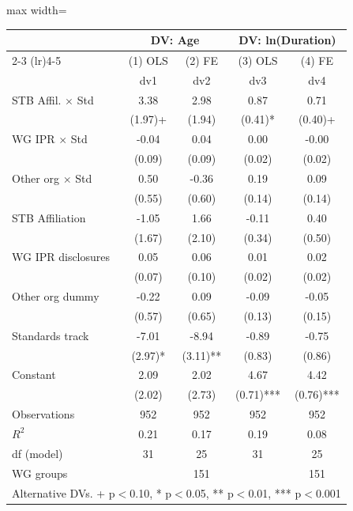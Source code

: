 \begin{adjustbox}{max width=\textwidth}
\begin{tabular}{lcccc}
\toprule
 & \multicolumn{2}{c}{DV: Age} & \multicolumn{2}{c}{DV: ln(Duration)} \\
\cmidrule(lr){2-3} \cmidrule(lr){4-5}
 & (1) OLS & (2) FE & (3) OLS & (4) FE \\
\midrule
 & dv1 & dv2 & dv3 & dv4 \\
STB Affil. $\times$ Std & 3.38 & 2.98 & 0.87 & 0.71 \\
 & (1.97)+ & (1.94) & (0.41)* & (0.40)+ \\
WG IPR $\times$ Std & -0.04 & 0.04 & 0.00 & -0.00 \\
 & (0.09) & (0.09) & (0.02) & (0.02) \\
Other org $\times$ Std & 0.50 & -0.36 & 0.19 & 0.09 \\
 & (0.55) & (0.60) & (0.14) & (0.14) \\
STB Affiliation & -1.05 & 1.66 & -0.11 & 0.40 \\
 & (1.67) & (2.10) & (0.34) & (0.50) \\
WG IPR disclosures & 0.05 & 0.06 & 0.01 & 0.02 \\
 & (0.07) & (0.10) & (0.02) & (0.02) \\
Other org dummy & -0.22 & 0.09 & -0.09 & -0.05 \\
 & (0.57) & (0.65) & (0.13) & (0.15) \\
Standards track & -7.01 & -8.94 & -0.89 & -0.75 \\
 & (2.97)* & (3.11)** & (0.83) & (0.86) \\
Constant & 2.09 & 2.02 & 4.67 & 4.42 \\
 & (2.02) & (2.73) & (0.71)*** & (0.76)*** \\
\midrule
Observations & 952 & 952 & 952 & 952 \\
$R^2$ & 0.21 & 0.17 & 0.19 & 0.08 \\
df (model) & 31 & 25 & 31 & 25 \\
WG groups &  & 151 &  & 151 \\
\bottomrule
\multicolumn{5}{l}{\footnotesize Alternative DVs. + p$<$0.10, * p$<$0.05, ** p$<$0.01, *** p$<$0.001} \\
\end{tabular}
\end{adjustbox}
